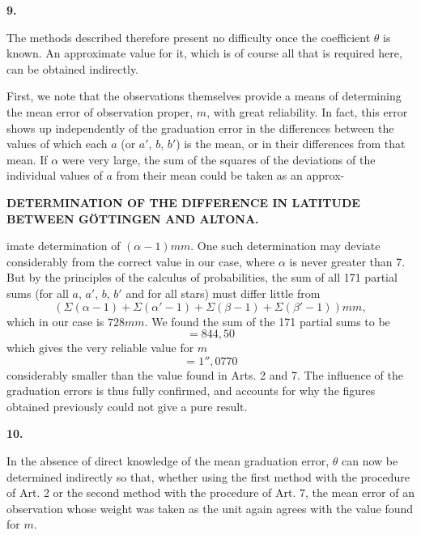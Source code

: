 \begin{center}\textbf{9.}\end{center}

The methods described therefore present no difficulty once the coefficient
\(\theta\) is known. An approximate value for it, which is of course all
that is required here, can be obtained
indirectly.

First, we note that the observations themselves provide a means of determining
the mean error of observation proper, \(m\), with great reliability.
In fact, this error shows up independently of the graduation error in the
differences between the  values of which each \(a\)
(or \(a'\), \(b\), \(b'\)) is the mean, or in their differences from that mean.
If \(\alpha\) were very large, the sum of the squares of the deviations of the
individual values of \(a\) from their mean could be taken as an approx-
\par

\par\clearpage
\noindent{}\parbox[t]{\dimexpr\linewidth-24mm\relax}{\centering\scriptsize\bfseries DETERMINATION OF THE DIFFERENCE IN LATITUDE BETWEEN GÖTTINGEN AND ALTONA.}\makebox[12mm][r]{}\par\medskip

\noindent imate determination of \((\alpha-1)mm\). One such determination may
deviate considerably from the correct value in our case, where \(\alpha\) is
never greater than 7. But by the principles of the calculus of probabilities,
the sum of all 171 partial sums (for all \(a\), \(a'\), \(b\), \(b'\) and for all stars)
must differ little from
\[
(\Sigma(\alpha-1)+\Sigma(\alpha'-1)+\Sigma(\beta-1)+\Sigma(\beta'-1))mm,
\]
\noindent which in our case is \(728mm\). We found the sum
of the 171 partial sums to be
\[
=844{,}50
\]
\noindent which gives the very reliable value for \(m\)
\[
=1''{,}0770
\]
\noindent considerably smaller than the value found in Arts. 2 and 7.
The influence of the graduation errors is thus fully confirmed, and accounts
for why the figures obtained previously could not give a pure result.

\begin{center}\textbf{10.}\end{center}

In the absence of direct knowledge of the mean graduation error, \(\theta\)
can now be determined indirectly so that, whether using the first method
with the procedure of Art. 2 or the second method with the procedure of
Art. 7, the mean error of an observation whose weight was taken as the
unit again agrees with the value found for
\(m\).

